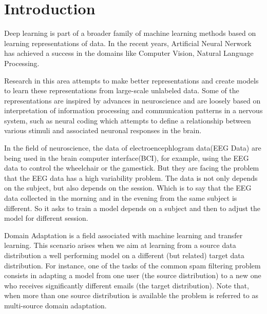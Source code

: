 
\chapter{Introduction} %

\label{Chapter1} %



Deep learning is part of a broader family of machine learning methods based on learning representations of data. In the recent years, Artificial Neural Nerwork has achieved a success in the domains like Computer Vision, Natural Language Processing. 

Research in this area attempts to make better representations and create models to learn these representations from large-scale unlabeled data. Some of the representations are inspired by advances in neuroscience and are loosely based on interpretation of information processing and communication patterns in a nervous system, such as neural coding which attempts to define a relationship between various stimuli and associated neuronal responses in the brain.\cite{olshausen1996emergence}

In the field of neuroscience, the data of electroencephlogram data(EEG Data) are being used in the brain computer interface(BCI), for example, using the EEG data to control the wheelchair or the gamestick. But they are facing the problem that the EEG data has a high variability problem. The data is not only depends on the subject, but also depends on the session. Which is to say that the EEG data collected in the morning and in the evening from the same subject is different. So it asks to train a model depends on a subject and then to adjust the model for different session.

Domain Adaptation\cite{bridle1990recnorm}\cite{ben2010theory} is a field associated with machine learning and transfer learning. This scenario arises when we aim at learning from a source data distribution a well performing model on a different (but related) target data distribution. For instance, one of the tasks of the common spam filtering problem consists in adapting a model from one user (the source distribution) to a new one who receives significantly different emails (the target distribution). Note that, when more than one source distribution is available the problem is referred to as multi-source domain adaptation.\cite{crammer2008learning}

